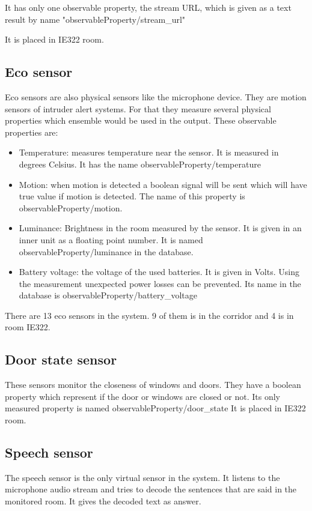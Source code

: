  It has only one observable property, the stream URL, which is given as a text result by name "observableProperty/stream\_url"
 
 It is placed in IE322 room.
 
 \subsection*{Eco sensor}
 Eco sensors are also physical sensors like the microphone device. They are motion sensors of intruder alert systems. For that they measure several physical properties which ensemble would be used in the output. These observable properties are:
 \begin{itemize}
 \item Temperature: measures temperature near the sensor. It is measured in degrees Celsius. It has the name observableProperty/temperature
 \item Motion: when motion is detected a boolean signal will be sent which will have true value if motion is detected. The name of this property is observableProperty/motion.
 \item Luminance: Brightness in the room measured by the sensor. It is given in an inner unit as a floating point number. It is named observableProperty/luminance in the database.
 \item Battery voltage: the voltage of the used batteries. It is given in Volts. Using the measurement unexpected power losses can be prevented. Its name in the database is observableProperty/battery\_voltage
 \end{itemize}
 There are 13 eco sensors in the system. 9 of them is in the corridor and 4 is in room IE322.  
 
 \subsection*{Door state sensor}
 These sensors monitor the closeness of windows and doors. They have a boolean property which represent if the door or windows are closed or not. Its only measured property is named observableProperty/door\_state
 It is placed in IE322 room.
 
\subsection*{Speech sensor}

The speech sensor is the only virtual sensor in the system. It listens to the microphone audio stream and tries to decode the sentences that are said in the monitored room. It gives the decoded text as answer.

